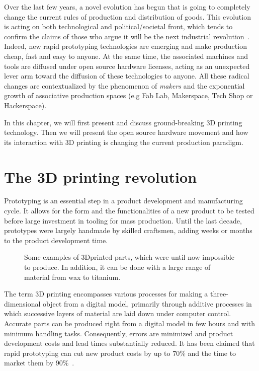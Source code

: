 Over the last few years, a novel evolution has begun that is going to completely change the current rules of production and distribution of goods. This evolution is acting on both technological and political/societal front, which tends to confirm the claims of those who argue it will be the next industrial revolution~\parencite{anderson2012makers}. Indeed, new rapid prototyping technologies are emerging and make production cheap, fast and easy to anyone. At the same time, the associated machines and tools are diffused under open source hardware licenses, acting as an unexpected lever arm toward the diffusion of these technologies to anyone. All these radical changes are contextualized by the phenomenon of \emph{makers} and the exponential growth of associative production spaces (e.g Fab Lab, Makerspace, Tech Shop or Hackerspace).

In this chapter, we will first present and discuss ground-breaking 3D printing technology. Then we will present the open source hardware movement and how its interaction with 3D printing is changing the current production paradigm.


\section{The 3D printing revolution} %

Prototyping is an essential step in a product development and manufacturing cycle. It allows for the form and the functionalities of a new product to be tested before large investment in tooling for mass production. Until the last decade, prototypes were largely handmade by skilled craftsmen, adding weeks or months to the product development time.

\begin{figure}[tb]
\centering
    \hfil
    \hfil
    \caption{Some examples of 3Dprinted parts, which were until now impossible to produce. In addition, it can be done with a large range of material from wax to titanium.}
    \label{fig:3D_printed_objects}
\end{figure}

The term 3D printing  encompasses various processes for making a three-dimensional object from a digital model, primarily through additive processes in which successive layers of material are laid down under computer control.
Accurate parts can be produced right from a digital model in few hours and with minimum handling tasks. Consequently, errors are minimized and product development costs and lead times substantially reduced. It has been claimed that rapid prototyping can cut new product costs by up to 70\% and the time to market them by 90\%~\parencite{waterman1994rapid}.

